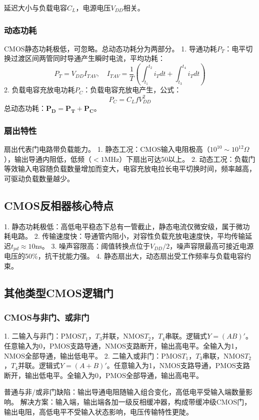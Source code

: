 延迟大小与负载电容\(C_L\)，电源电压\(V_{DD}\)相关。

\subsubsection{动态功耗}
CMOS静态功耗极低，可忽略。总动态功耗分为两部分。
1. 导通功耗\(P_T\)：电平切换过渡区间两管同时导通产生瞬时电流，平均功耗：
\[
P_T = V_{DD} I_{TAV},\quad I_{TAV}=\frac{1}{T}\left(\int_{t_1}^{t_2}i_T dt + \int_{t_3}^{t_4}i_T dt\right)
\]
2. 负载电容充放电功耗\(P_C\)：负载电容充放电产生，公式：
\[
P_C = C_L f V_{DD}^2
\]
总动态功耗：\(\boldsymbol{P_D = P_T + P_C}\)。

\subsubsection{扇出特性}
扇出代表门电路带负载能力。
1. 静态工况：CMOS输入电阻极高（\(10^{10}\sim10^{12}\Omega\)），输出导通内阻低，低频（\(<1\mathrm{MHz}\)）下扇出可达50以上。
2. 动态工况：负载门等效输入电容随负载数量增加而变大，电容充放电拉长电平切换时间，频率越高，可驱动负载数量越少。

\subsection{CMOS反相器核心特点}
1. 静态功耗极低：高低电平稳态下总有一管截止，静态电流仅微安级，属于微功耗电路。
2. 传输速度快：导通管内阻小，对容性负载充放电速度快，平均传输延迟\(t_{pd}\approx10\mathrm{ns}\)。
3. 噪声容限高：阈值转换点位于\(V_{DD}/2\)，噪声容限最高可接近电源电压的50\%，抗干扰能力强。
4. 静态扇出大，动态扇出受工作频率与负载电容约束。

\subsection{其他类型CMOS逻辑门}
\subsubsection{CMOS与非门、或非门}
1. 二输入与非门：PMOS\(T_1\)，\(T_3\)并联，NMOS\(T_2\)，\(T_4\)串联。逻辑式\(Y=(AB)'\)。任意输入为0，PMOS支路导通，NMOS支路断开，输出高电平。全输入为1，NMOS全部导通，输出低电平。
2. 二输入或非门：PMOS\(T_1\)，\(T_3\)串联，NMOS\(T_2\)，\(T_4\)并联。逻辑式\(Y=(A+B)'\)。任意输入为1，NMOS支路导通，PMOS支路断开，输出低电平。全输入为0，PMOS全部导通，输出高电平。

普通与非/或非门缺陷：输出导通电阻随输入组合变化，高低电平受输入端数量影响。
解决方案：输入端，输出端各加一级反相缓冲器，构成带缓冲级CMOS门，输出电阻，高低电平不受输入状态影响，电压传输特性更陡。

